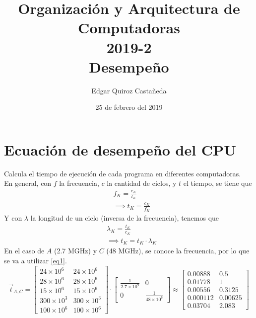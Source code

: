 \documentclass[]{article}
\begin{document}
    \title {
        Organización y Arquitectura de Computadoras \\
        2019-2 \\
        Desempeño
    }
    \author{
        Edgar Quiroz Castañeda
    }
    \date{
        25 de febrero del 2019
    }
    \maketitle

    \section{
        Ecuación de desempeño del CPU
    }
    Calcula el tiempo de ejecución de cada programa en diferentes computadoras.\\
    En general, con $f$ la frecuencia, $c$ la cantidad de ciclos, y $t$ el 
    tiempo, se tiene que
    \begin{align}
        &f_{K} = \frac{c_{K}}{t_{K}} \nonumber \\
        &\implies t_{K} = \frac{c_{K}}{f_{K}} \label{eq1}
    \end{align}
    Y con $\lambda$ la longitud de un ciclo (inversa de la frecuencia), tenemos 
    que 
    \begin{align}
        &\lambda_{K} = \frac{t_{K}}{c_{K}} \nonumber \\
        &\implies t_{K} = t_{K} \cdot \lambda_{K} \label{eq2}
    \end{align}
    En el caso de $A$ (2.7 MGHz) y $C$ (48 MGHz), se conoce la frecuencia, por 
    lo que se va a utilizar
    \eqref{eq1}. 
    \[
    \vec{t}_{A, C} = 
    \begin{bmatrix}
        24 \times 10^6 & 24 \times 10^6\\ 
        28 \times 10^6 & 28 \times 10^6\\
        15 \times 10^6 & 15 \times 10^6\\
        300 \times 10^3 & 300 \times 10^3\\
        100 \times 10^6 & 100 \times 10^6
    \end{bmatrix}    
    \cdot
    \begin{bmatrix}
        \frac{1}{2.7 \times 10^{9}} & 0\\
        0 & \frac{1}{48 \times 10^{6}}
    \end{bmatrix}
    \approx
    \begin{bmatrix}
        0.00888 & 0.5 \\
        0.01778 & 1 \\
        0.00556 & 0.3125 \\
        0.000112 & 0.00625 \\ 
        0.03704 & 2.083
    \end{bmatrix}
    \]
\end{document}
